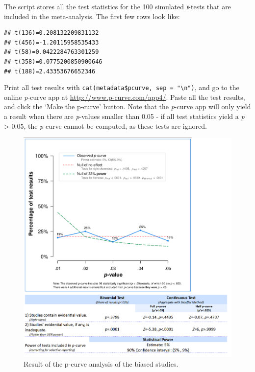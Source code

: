 \documentclass[
  oneside]{book}
\begin{document}
The script stores all the test statistics for the 100 simulated \emph{t}-tests that are included in the meta-analysis. The first few rows look like:

\begin{verbatim}
## t(136)=0.208132209831132
## t(456)=-1.20115958535433
## t(58)=0.0422284763301259
## t(358)=0.0775200850900646
## t(188)=2.43353676652346
\end{verbatim}

Print all test results with \texttt{cat(metadata\$pcurve,\ sep\ =\ "\textbackslash{}n")}, and go to the online \emph{p}-curve app at \url{http://www.p-curve.com/app4/}. Paste all the test results, and click the `Make the p-curve' button. Note that the \emph{p}-curve app will only yield a result when there are \emph{p}-values smaller than 0.05 - if all test statistics yield a \emph{p} \textgreater{} 0.05, the \emph{p}-curve cannot be computed, as these tests are ignored.



\begin{figure}

{\centering \includegraphics[width=1\linewidth]{images/pcurveresult} 

}

\caption{Result of the p-curve analysis of the biased studies.}\label{fig:pcurveresult}
\end{figure}
\end{document}
